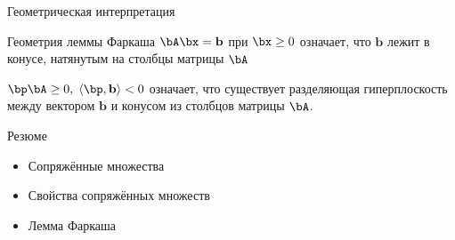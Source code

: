 \documentclass[12pt]{beamer}
\begin{document}
\begin{frame}{Геометрическая интерпретация}
\begin{block}{Геометрия леммы Фаркаша}
$\bA\bx = \mathbf{b}$ при $\bx \geq 0$ означает, что $\mathbf{b}$ лежит в конусе, натянутым на столбцы матрицы $\bA$

$\bp\bA \geq 0, \; \langle \bp, \mathbf{b} \rangle < 0$ означает, что существует разделяющая гиперплоскость между вектором $\mathbf{b}$ и конусом из столбцов матрицы $\bA$.
\end{block}
\end{frame}

\begin{frame}{Резюме}
\begin{itemize}
\item Сопряжённые множества
\item Свойства сопряжённых множеств
\item Лемма Фаркаша
\end{itemize}

\end{frame}
\end{document}
